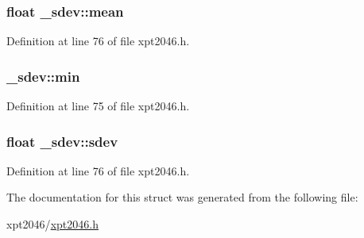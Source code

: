 \subsubsection[{\texorpdfstring{mean}{mean}}]{\setlength{\rightskip}{0pt plus 5cm}float \+\_\+sdev\+::mean}\hypertarget{struct__sdev_a2bd0cf80fd334fabaac9100a2538bcb5}{}\label{struct__sdev_a2bd0cf80fd334fabaac9100a2538bcb5}


Definition at line 76 of file xpt2046.\+h.

\subsubsection[{\texorpdfstring{min}{min}}]{ \+\_\+sdev\+::min}\hypertarget{struct__sdev_af6ec6d9f07c677d6a25c12c128a60d21}{}\label{struct__sdev_af6ec6d9f07c677d6a25c12c128a60d21}


Definition at line 75 of file xpt2046.\+h.

\subsubsection[{\texorpdfstring{sdev}{sdev}}]{\setlength{\rightskip}{0pt plus 5cm}float \+\_\+sdev\+::sdev}\hypertarget{struct__sdev_a053a14f9e4bd729ce23aafdb1e69e48a}{}\label{struct__sdev_a053a14f9e4bd729ce23aafdb1e69e48a}


Definition at line 76 of file xpt2046.\+h.



The documentation for this struct was generated from the following file\+:\begin{DoxyCompactItemize}
\item 
xpt2046/\hyperlink{xpt2046_8h}{xpt2046.\+h}\end{DoxyCompactItemize}
